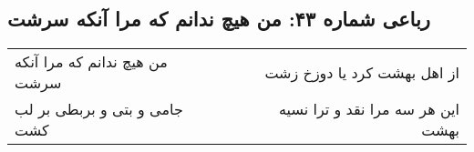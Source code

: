 \begin{center}
\section*{رباعی شماره ۴۳: من هیچ ندانم که مرا آنکه سرشت}
\label{sec:sh043}
\begin{longtable}{l p{0.5cm} r}
من هیچ ندانم که مرا آنکه سرشت
&&
از اهل بهشت کرد یا دوزخ زشت
\\
جامی و بتی و بربطی بر لب کشت
&&
این هر سه مرا نقد و ترا نسیه بهشت
\\
\end{longtable}
\end{center}
